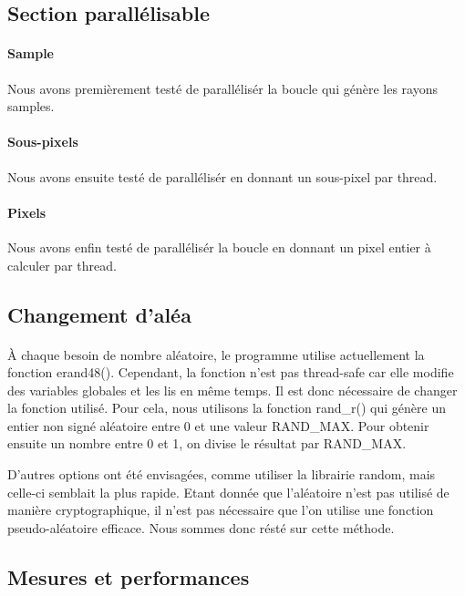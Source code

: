 \documentclass{article}
\begin{document}
\subsection{Section parall\'elisable}
\paragraph{Sample}
Nous avons premi\`erement testé de parall\'elis\'er la boucle qui g\'en\`ere les rayons samples. 

\paragraph{Sous-pixels}
Nous avons ensuite testé de parall\'elis\'er en donnant un sous-pixel par thread. 

\paragraph{Pixels}
Nous avons enfin testé de parall\'elis\'er la boucle en donnant un pixel entier \`a calculer par thread. 

\subsection{Changement d'al\'ea}
\paragraph{}
\`A chaque besoin de nombre al\'eatoire, le programme utilise actuellement la fonction erand48().
Cependant, la fonction n'est pas thread-safe car elle modifie des variables globales et les lis en m\^eme temps. Il est donc n\'ecessaire de changer la fonction utilis\'e.
Pour cela, nous utilisons la fonction rand\_r() qui g\'en\`ere un entier non sign\'e al\'eatoire entre 0 et une valeur RAND\_MAX. Pour obtenir ensuite un nombre entre
0 et 1, on divise le r\'esultat par RAND\_MAX.

D'autres options ont \'et\'e envisag\'ees, comme utiliser la librairie random, mais celle-ci semblait la plus rapide. 
Etant donn\'ee que l'al\'eatoire n'est pas utilis\'e de mani\`ere cryptographique, il n'est pas nécessaire que l'on utilise une fonction pseudo-aléatoire efficace. Nous sommes donc r\'est\'e sur cette m\'ethode.

\subsection{Mesures et performances}
\end{document}
